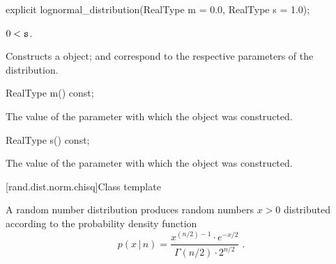 %
\begin{itemdecl}
explicit lognormal_distribution(RealType m = 0.0, RealType s = 1.0);
\end{itemdecl}

\begin{itemdescr}
\pnum\requires
 $ 0 < \texttt{s} $.

\pnum\effects Constructs a  object;
  and 
 correspond to the respective parameters of the distribution.
\end{itemdescr}

%
%
\begin{itemdecl}
RealType m() const;
\end{itemdecl}

\begin{itemdescr}
\pnum\returns The value of the  parameter
 with which the object was constructed.
\end{itemdescr}

%
%
\begin{itemdecl}
RealType s() const;
\end{itemdecl}

\begin{itemdescr}
\pnum\returns The value of the  parameter
 with which the object was constructed.
\end{itemdescr}


[rand.dist.norm.chisq]{Class template }%
%

\pnum
A  random number distribution
produces random numbers $x>0$
distributed according to
the probability density function%
%
\[%
 p(x\,|\,n)
      =  \frac{ x^{(n/2)-1} \cdot e^{-x/2}}
              {\Gamma(n/2) \cdot 2^{n/2}}
\; \mbox{.}
\]

